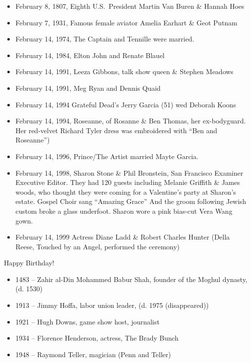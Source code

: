 \documentclass[12pt]{article}
\begin{document}
\vspace{-0.75 cm}
\begin{itemize}\setlength{\itemsep}{-0.12 cm}
\item February 8, 1807, Eighth U.S.\ President Martin Van Buren \& Hannah Hoes
\item February 7, 1931, Famous female aviator Amelia Earhart \& Geot Putnam
\item February 14, 1974, The Captain and Tennille were married.
\item February 14, 1984, Elton John and Renate Blauel
\item February 14, 1991, Leeza Gibbons, talk show queen \& Stephen Meadows
\item February 14, 1991, Meg Ryan and Dennis Quaid
\item February 14, 1994 Grateful Dead's Jerry Garcia (51) wed Deborah Koons
\item February 14, 1994, Roseanne, of Rosanne \& Ben Thomas, her ex-bodyguard. Her red-velvet Richard Tyler dress was embroidered with ``Ben and Roseanne'')
\item February 14, 1996, Prince/The Artist married Mayte Garcia.
\item February 14, 1998, Sharon Stone \& Phil Bronstein, San Francisco Examiner Executive Editor. They had 120 guests including Melanie Griffith \& James woods, who thought they were coming for a Valentine's party at Sharon's estate. Gospel Choir sang ``Amazing Grace'' And the groom following Jewish custom broke a glass underfoot. Sharon wore a pink bias-cut Vera Wang gown.
\item February 14, 1999 Actress Diane Ladd \& Robert Charles Hunter (Della Reese, Touched by an Angel, performed the ceremony)
\end{itemize}

Happy Birthday!

\vspace{-0.75 cm}
\begin{itemize}\setlength{\itemsep}{-0.12 cm}
\item 1483 -- Zahir al-Din Mohammed Babur Shah, founder of the Moghul dynasty, (d. 1530)
\item 1913 -- Jimmy Hoffa, labor union leader, (d. 1975 (disappeared))
\item 1921 -- Hugh Downs, game show host, journalist
\item 1934 -- Florence Henderson, actress, The Brady Bunch
\item 1948 -- Raymond Teller, magician (Penn and Teller)
\end{itemize}
\end{document}
